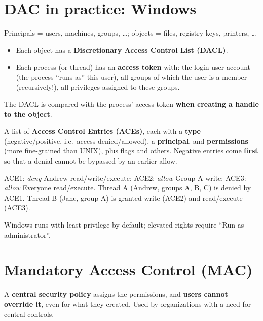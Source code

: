 \section{DAC in practice: Windows}

\begin{defnbox}[title=Windows access control]
Principals = users, machines, groups, \ldots; objects = files, registry keys, printers,
\ldots
\begin{itemize}
  \item Each object has a \textbf{Discretionary Access Control List (DACL)}.
  \item Each process (or thread) has an \textbf{access token} with: the login user
        account (the process ``runs as'' this user), all groups of which the user is a
        member (recursively!), all privileges assigned to these groups.
\end{itemize}
The DACL is compared with the process' access token \textbf{when creating a handle to the
object}.
\end{defnbox}

\begin{defnbox}[title=DACL]
A list of \textbf{Access Control Entries (ACEs)}, each with a \textbf{type}
(negative/positive, i.e.\ access denied/allowed), a \textbf{principal}, and
\textbf{permissions} (more fine-grained than UNIX), plus flags and others. Negative
entries come \textbf{first} so that a denial cannot be bypassed by an earlier allow.
\end{defnbox}

\begin{exbox}[title=DACL evaluation]
ACE1: \textit{deny} Andrew read/write/execute; ACE2: \textit{allow} Group A write; ACE3:
\textit{allow} Everyone read/execute. Thread A (Andrew, groups A, B, C) is denied by ACE1.
Thread B (Jane, group A) is granted write (ACE2) and read/execute (ACE3).
\end{exbox}

\begin{rembox}[title=Least privilege by default]
Windows runs with least privilege by default; elevated rights require
``Run as administrator''.
\end{rembox}

\section{Mandatory Access Control (MAC)}

\begin{defnbox}[title=Mandatory Access Control (MAC)]
A \textbf{central security policy} assigns the permissions, and \textbf{users cannot
override it}, even for what they created. Used by organizations with a need for central
controls.
\end{defnbox}


